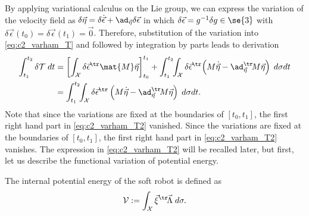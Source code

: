 \noindent By applying variational calculus on the Lie group, we can express the variation of the velocity field as $\delta\vec{\eta} = \delta \dot{\vec{\epsilon}} + \ad_{\vec{\eta}} \delta \vec{\epsilon}$ in which $\delta \vec{\epsilon} = g^{-1} \delta g \in \se{3}$ with $\delta \vec{\epsilon}(t_0) = \delta \vec{\epsilon}(t_1) = \vec{0}$. Therefore, substitution of the variation into \eqref{eq:c2_varham_T} and followed by integration by parts leads to derivation
\begin{align}
\int_{t_1}^{t_2} \delta\mathcal{T} \; dt& = 
\left[ \int_\mathcal{X} \delta \vec{\epsilon}^\tr \mat{M} \vec{\eta} \right]_{t_0}^{t_1} +  \int_{t_1}^{t_2} \!\! \int_\mathcal{X}  \delta \vec{\epsilon}^\tr \! \left( M\dot{\vec{\eta}} - \ad_{\vec{\eta}}^\tr \! M \vec{\eta}\right)\; d\sigma dt \notag \\ 
& = \int_{t_1}^{t_2} \!\! \int_\mathcal{X} \delta \vec{\epsilon}^\tr \left( M\dot{\vec{\eta}} - \ad_{\vec{\eta}}^\tr \! M \vec{\eta}\right)\; d\sigma dt\label{eq:c2_varham_T2}.
\end{align}
Note that since the variations are fixed at the boundaries of $[t_0,t_1]$, the first right hand part in \eqref{eq:c2_varham_T2} vanished. Since the variations are fixed at the boundaries of $[t_0,t_1]$, the first right hand part in \eqref{eq:c2_varham_T2} vanishes. The expression in \eqref{eq:c2_varham_T2} will be recalled later, but first, let us describe the functional variation of potential energy. 

The internal potential energy of the soft robot is defined as
\begin{equation}
\mathcal{V} := \int_\mathcal{X} \vec{\xi}^\tr\! \vec{\Lambda} \;d\sigma.
\end{equation}

